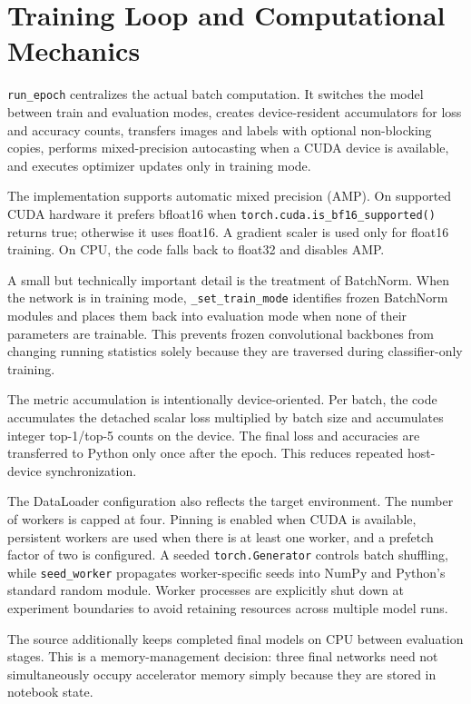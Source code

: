 \documentclass[11pt,a4paper]{article}
\begin{document}
\section{Training Loop and Computational Mechanics}
\texttt{run\_epoch} centralizes the actual batch computation. It switches the model between train and evaluation modes, creates device-resident accumulators for loss and accuracy counts, transfers images and labels with optional non-blocking copies, performs mixed-precision autocasting when a CUDA device is available, and executes optimizer updates only in training mode.

The implementation supports automatic mixed precision (AMP). On supported CUDA hardware it prefers bfloat16 when \texttt{torch.cuda.is\_bf16\_supported()} returns true; otherwise it uses float16. A gradient scaler is used only for float16 training. On CPU, the code falls back to float32 and disables AMP.

A small but technically important detail is the treatment of BatchNorm. When the network is in training mode, \texttt{\_set\_train\_mode} identifies frozen BatchNorm modules and places them back into evaluation mode when none of their parameters are trainable. This prevents frozen convolutional backbones from changing running statistics solely because they are traversed during classifier-only training.

The metric accumulation is intentionally device-oriented. Per batch, the code accumulates the detached scalar loss multiplied by batch size and accumulates integer top-1/top-5 counts on the device. The final loss and accuracies are transferred to Python only once after the epoch. This reduces repeated host-device synchronization.

The DataLoader configuration also reflects the target environment. The number of workers is capped at four. Pinning is enabled when CUDA is available, persistent workers are used when there is at least one worker, and a prefetch factor of two is configured. A seeded \texttt{torch.Generator} controls batch shuffling, while \texttt{seed\_worker} propagates worker-specific seeds into NumPy and Python's standard random module. Worker processes are explicitly shut down at experiment boundaries to avoid retaining resources across multiple model runs.

The source additionally keeps completed final models on CPU between evaluation stages. This is a memory-management decision: three final networks need not simultaneously occupy accelerator memory simply because they are stored in notebook state.
\end{document}
